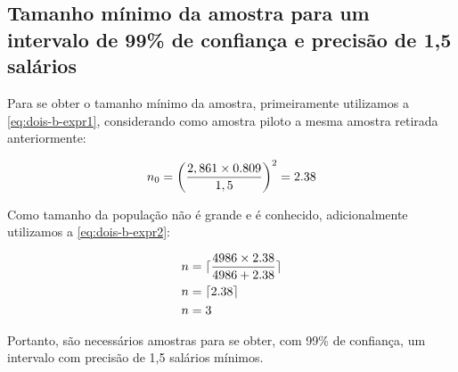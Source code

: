 \subsection{Tamanho mínimo da amostra para um intervalo de 99\% de confiança e precisão de 1,5 salários}
Para se obter o tamanho mínimo da amostra, primeiramente utilizamos a \autoref{eq:dois-b-expr1}, considerando 
como amostra piloto a mesma amostra retirada anteriormente:

\begin{align*}
	n_0 = \left (\frac{2,861 \times \TRESsd}{1,5} \right)^2 = \TRESnZero %
\end{align*}

Como tamanho da população não é grande e é conhecido, adicionalmente utilizamos a \autoref{eq:dois-b-expr2}:

\begin{align*}
		n &= \lceil \frac{4986 \times 2.38}{4986 + 2.38} \rceil \\
		n &= \lceil 2.38 \rceil \\
		n &= 3
\end{align*}

Portanto, são necessários \TRESnZeroCorrigidoRounded amostras para se obter, com 99\% de confiança,
um intervalo com precisão de 1,5 salários mínimos.



